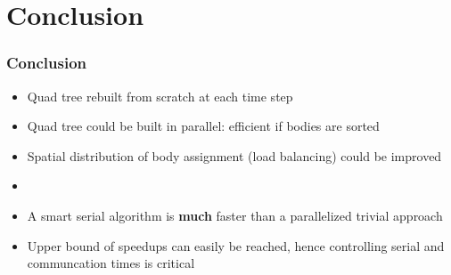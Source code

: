 \section{Conclusion}

\begin{frame}
\frametitle{Conclusion}
\begin{itemize}
  \item Quad tree rebuilt from scratch at each time step
  \item Quad tree could be built in parallel: efficient if bodies are sorted
  \item Spatial distribution of body assignment (load balancing) could be improved
  \item[] 
  \item A smart serial algorithm is \textbf{much} faster than a parallelized trivial approach
  \item Upper bound of speedups can easily be reached, hence controlling serial and communcation times is critical
\end{itemize}
\end{frame}





